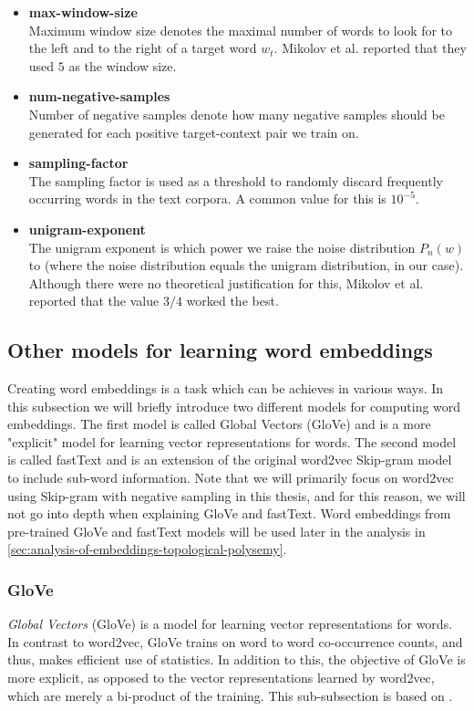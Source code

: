 \begin{itemize}
    \item \textbf{max-window-size} \\
        Maximum window size denotes the maximal number of words to look for to the left and to the right of a target word $w_t$. Mikolov et al. reported that they used $5$ as the window size.
    \item \textbf{num-negative-samples} \\
        Number of negative samples denote how many negative samples should be generated for each positive target-context pair we train on.
    \item \textbf{sampling-factor} \\
        The sampling factor is used as a threshold to randomly discard frequently occurring words in the text corpora. A common value for this is $10^{-5}$.
    \item \textbf{unigram-exponent} \\
        The unigram exponent is which power we raise the noise distribution $P_n(w)$ to (where the noise distribution equals the unigram distribution, in our case). Although there were no theoretical justification for this, Mikolov et al. reported that the value $3/4$ worked the best.
\end{itemize}

\subsection{Other models for learning word embeddings}
Creating word embeddings is a task which can be achieves in various ways. In this subsection we will briefly introduce two different models for computing word embeddings. The first model is called Global Vectors (GloVe) \cite{pennington2014glove} and is a more "explicit" model for learning vector representations for words. The second model is called fastText \cite{bojanowski2017enriching} and is an extension of the original word2vec Skip-gram model to include sub-word information. Note that we will primarily focus on word2vec using Skip-gram with negative sampling in this thesis, and for this reason, we will not go into depth when explaining GloVe and fastText. Word embeddings from pre-trained GloVe and fastText models will be used later in the analysis in \cref{sec:analysis-of-embeddings-topological-polysemy}.

\subsubsection{GloVe}
\label{sec:glove}
\textit{Global Vectors} (GloVe) \cite{pennington2014glove} is a model for learning vector representations for words. In contrast to word2vec, GloVe trains on word to word co-occurrence counts, and thus, makes efficient use of statistics. In addition to this, the objective of GloVe is more explicit, as opposed to the vector representations learned by word2vec, which are merely a bi-product of the training. This sub-subsection is based on \cite{pennington2014glove}.


